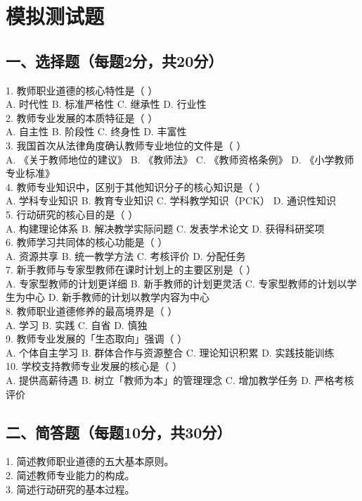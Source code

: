 \documentclass[12pt,a4paper]{article}
\begin{document}
\newpage

\section{模拟测试题}
\subsection{一、选择题（每题2分，共20分）}
1. 教师职业道德的核心特性是（ ）\\
A. 时代性 B. 标准严格性 C. 继承性 D. 行业性\\
2. 教师专业发展的本质特征是（ ）\\
A. 自主性 B. 阶段性 C. 终身性 D. 丰富性\\
3. 我国首次从法律角度确认教师专业地位的文件是（ ）\\
A. 《关于教师地位的建议》 B. 《教师法》 C. 《教师资格条例》 D. 《小学教师专业标准》\\
4. 教师专业知识中，区别于其他知识分子的核心知识是（ ）\\
A. 学科专业知识 B. 教育专业知识 C. 学科教学知识（PCK） D. 通识性知识\\
5. 行动研究的核心目的是（ ）\\
A. 构建理论体系 B. 解决教学实际问题 C. 发表学术论文 D. 获得科研奖项\\
6. 教师学习共同体的核心功能是（ ）\\
A. 资源共享 B. 统一教学方法 C. 考核评价 D. 分配任务\\
7. 新手教师与专家型教师在课时计划上的主要区别是（ ）\\
A. 专家型教师的计划更详细 B. 新手教师的计划更灵活 C. 专家型教师的计划以学生为中心 D. 新手教师的计划以教学内容为中心\\
8. 教师职业道德修养的最高境界是（ ）\\
A. 学习 B. 实践 C. 自省 D. 慎独\\
9. 教师专业发展的「生态取向」强调（ ）\\
A. 个体自主学习 B. 群体合作与资源整合 C. 理论知识积累 D. 实践技能训练\\
10. 学校支持教师专业发展的核心是（ ）\\
A. 提供高薪待遇 B. 树立「教师为本」的管理理念 C. 增加教学任务 D. 严格考核评价\\

\subsection{二、简答题（每题10分，共30分）}
1. 简述教师职业道德的五大基本原则。\\
2. 简述教师专业能力的构成。\\
3. 简述行动研究的基本过程。\\
\end{document}
